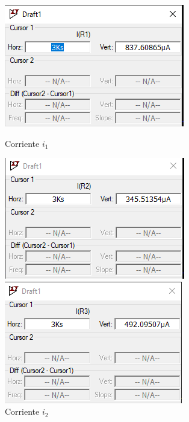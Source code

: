 \documentclass[a4paper,12pt]{article}
\begin{document}
\begin{figure}[H]
    \centering
    \begin{minipage}{0.31\textwidth}
        \centering
        \includegraphics[width=\linewidth]{imagenes/i1resultado.png}
        \caption*{Corriente $i_1$}
    \end{minipage}
    \hfill
    \begin{minipage}{0.31\textwidth}
        \centering
        \includegraphics[width=\linewidth]{imagenes/i2resultado.png}
        \caption*{Corriente $i_2$}
    \end{minipage}
    \hfill
    \begin{minipage}{0.31\textwidth}
        \centering
        \includegraphics[width=\linewidth]{imagenes/i3resultado.png}

\end{minipage}
\end{figure}
\end{document}

